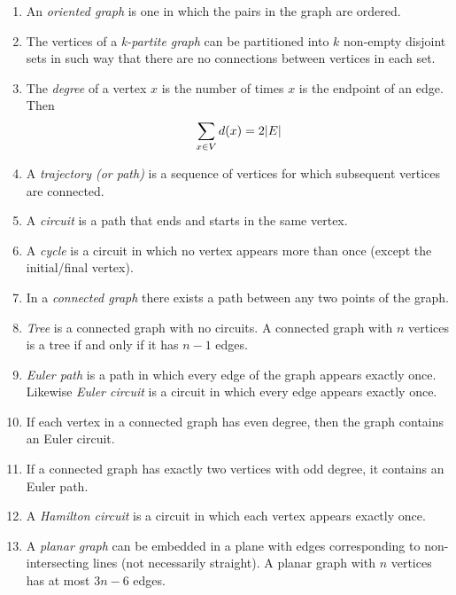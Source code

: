 \documentclass{article}
\begin{document}
\begin{enumerate}
	\item 
	An \emph{oriented graph} is one in which the pairs in the graph are ordered.
	\item
	The vertices of a \emph{k-partite graph} can be partitioned into $k$ non-empty disjoint sets in such way that there are no connections between vertices in each set.
	\item 
	The \emph{degree} of a vertex $x$ is the number of times $x$ is the endpoint of an edge. Then
	$$\sum_{x \in V} d(x) = 2 \abs{E} $$
	\item 
	A \emph{trajectory (or path)} is a sequence of vertices for which subsequent vertices are connected.
	\item 
	A \emph{circuit} is a path that ends and starts in the same vertex.
	\item 
	A \emph{cycle} is a circuit in which no vertex appears more than once (except the initial/final vertex).
	\item
	In a \emph{connected graph} there exists a path between any two points of the graph.
	\item 
	\emph{Tree} is a connected graph with no circuits. A connected graph with $n$ vertices is a tree if and only if it has $n-1$ edges.
	\item 
	\emph{Euler path} is a path in which every edge of the graph appears exactly once. Likewise \emph{Euler circuit} is a circuit in which every edge appears exactly once.
	\item 
	If each vertex in a connected graph has even degree, then the graph contains an Euler circuit.
	\item 
	If a connected graph has exactly two vertices with odd degree, it contains an Euler path.
	\item 
	A \emph{Hamilton circuit} is a circuit in which each vertex appears exactly once.
	\item 
	A \emph{planar graph} can be embedded in a plane with edges corresponding to non-intersecting lines (not necessarily straight). A planar graph with $n$ vertices has at most $3n-6$ edges.
	
\end{enumerate}

\newpage
\end{document}
